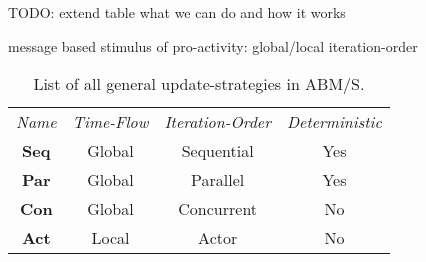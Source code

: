 TODO: extend table what we can do and how it works

message based
stimulus of pro-activity: global/local
iteration-order

\begin{table}[H]
	\center
	\begin{tabular}{ c | c | c | c  }
		\textit{Name} & \textit{Time-Flow} & \textit{Iteration-Order} & \textit{Deterministic} \\
		\hhline{=|=|=|=}
	    \textbf{Seq} & Global & Sequential & Yes \\
	    \hline
	    \textbf{Par} & Global & Parallel & Yes \\
	    \hline
	    \textbf{Con} & Global & Concurrent & No \\
	    \hline
	    \textbf{Act} & Local & Actor & No \\
	\end{tabular}
	\caption{List of all general update-strategies in ABM/S.}
\end{table}

